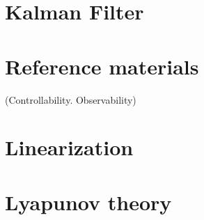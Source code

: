 \documentclass{article}
\begin{document}
\section{Kalman Filter}



\section{Reference materials}


(Controllability. Observability)

\section{Linearization}


\section{Lyapunov theory}

\end{document}
